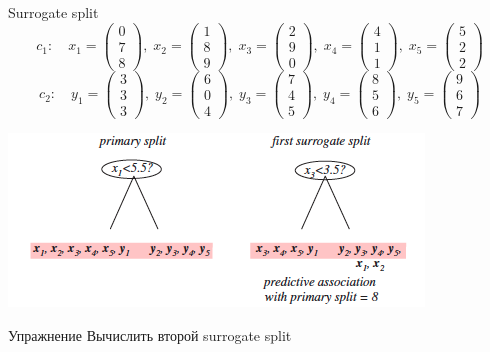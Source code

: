 \documentclass[10pt]{beamer}
\begin{document}
\begin{frame}{Surrogate split}
\vspace{-1em}
\[
c_1: \quad 
x_1=\begin{pmatrix}0 \\ 7 \\ 8\end{pmatrix},\;
x_2=\begin{pmatrix}1 \\ 8 \\ 9\end{pmatrix},\;
x_3=\begin{pmatrix}2 \\ 9 \\ 0\end{pmatrix},\;
x_4=\begin{pmatrix}4 \\ 1 \\ 1\end{pmatrix},\;
x_5=\begin{pmatrix}5 \\ 2 \\ 2\end{pmatrix}
\]
\[
c_2: \quad 
y_1=\begin{pmatrix}3 \\ 3 \\ 3\end{pmatrix},\;
y_2=\begin{pmatrix}6 \\ 0 \\ 4\end{pmatrix},\;
y_3=\begin{pmatrix}7 \\ 4 \\ 5\end{pmatrix},\;
y_4=\begin{pmatrix}8 \\ 5 \\ 6\end{pmatrix},\;
y_5=\begin{pmatrix}9 \\ 6 \\ 7\end{pmatrix}
\]
\begin{center}
\includegraphics[scale=0.6]{images/surrogate2.png}
\end{center}

\begin{exampleblock}{Упражнение}
Вычислить второй surrogate split
\end{exampleblock}

\end{frame}
\end{document}
